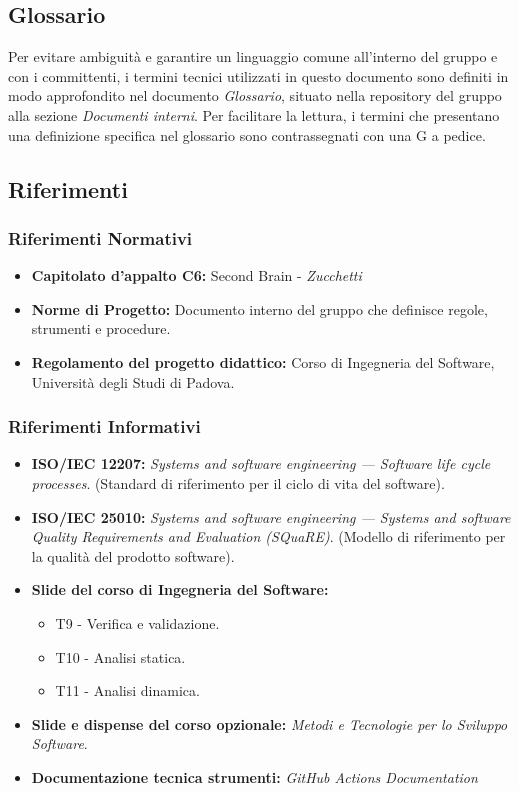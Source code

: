\documentclass[11pt,a4paper]{article}
\begin{document}
\subsection{Glossario}
Per evitare ambiguità e garantire un linguaggio comune all'interno del gruppo e con i committenti, i termini tecnici utilizzati in questo documento sono definiti in modo approfondito nel documento \textit{Glossario}, situato nella repository del gruppo alla sezione \textit{Documenti interni}. Per facilitare la lettura, i termini che presentano una definizione specifica nel glossario sono contrassegnati con una G a pedice.

\subsection{Riferimenti}
\subsubsection{Riferimenti Normativi}
\begin{itemize}
    \item \textbf{Capitolato d'appalto C6:} Second Brain - \textit{Zucchetti}
    \item \textbf{Norme di Progetto:} Documento interno del gruppo che definisce regole, strumenti e procedure.
    \item \textbf{Regolamento del progetto didattico:} Corso di Ingegneria del Software, Università degli Studi di Padova.
\end{itemize}

\subsubsection{Riferimenti Informativi}
\begin{itemize}
    \item \textbf{ISO/IEC 12207:} \textit{Systems and software engineering — Software life cycle processes}. (Standard di riferimento per il ciclo di vita del software).
    \item \textbf{ISO/IEC 25010:} \textit{Systems and software engineering — Systems and software Quality Requirements and Evaluation (SQuaRE)}. (Modello di riferimento per la qualità del prodotto software).
    \item \textbf{Slide del corso di Ingegneria del Software:}
    \begin{itemize}
        \item T9 - Verifica e validazione.
        \item T10 - Analisi statica.
        \item T11 - Analisi dinamica.
    \end{itemize}
    \item \textbf{Slide e dispense del corso opzionale:} \textit{Metodi e Tecnologie per lo Sviluppo Software}.
    \item \textbf{Documentazione tecnica strumenti:} \textit{GitHub Actions Documentation}
\end{itemize}
\end{document}
